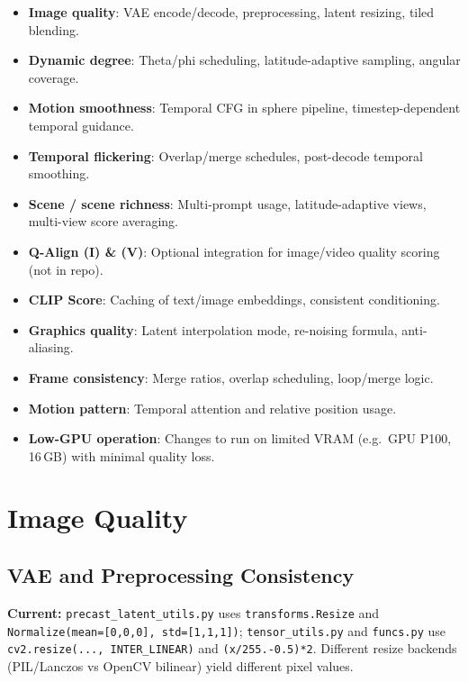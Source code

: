 \documentclass[11pt,a4paper]{article}
\newcommand{\file}[1]{\texttt{#1}}
\newcommand{\fn}[1]{\texttt{#1}}
\begin{document}
\begin{itemize}
    \item \textbf{Image quality}: VAE encode/decode, preprocessing, latent resizing, tiled blending.
    \item \textbf{Dynamic degree}: Theta/phi scheduling, latitude-adaptive sampling, angular coverage.
    \item \textbf{Motion smoothness}: Temporal CFG in sphere pipeline, timestep-dependent temporal guidance.
    \item \textbf{Temporal flickering}: Overlap/merge schedules, post-decode temporal smoothing.
    \item \textbf{Scene / scene richness}: Multi-prompt usage, latitude-adaptive views, multi-view score averaging.
    \item \textbf{Q-Align (I) \& (V)}: Optional integration for image/video quality scoring (not in repo).
    \item \textbf{CLIP Score}: Caching of text/image embeddings, consistent conditioning.
    \item \textbf{Graphics quality}: Latent interpolation mode, re-noising formula, anti-aliasing.
    \item \textbf{Frame consistency}: Merge ratios, overlap scheduling, loop/merge logic.
    \item \textbf{Motion pattern}: Temporal attention and relative position usage.
    \item \textbf{Low-GPU operation}: Changes to run on limited VRAM (e.g.\ GPU P100, 16\,GB) with minimal quality loss.
\end{itemize}

\section{Image Quality}

\subsection{VAE and Preprocessing Consistency}

\textbf{Current:} \file{precast\_latent\_utils.py} uses \fn{transforms.Resize} and \fn{Normalize(mean=[0,0,0], std=[1,1,1])}; \file{tensor\_utils.py} and \file{funcs.py} use \fn{cv2.resize(..., INTER\_LINEAR)} and \fn{(x/255.-0.5)*2}. Different resize backends (PIL/Lanczos vs OpenCV bilinear) yield different pixel values.
\end{document}
